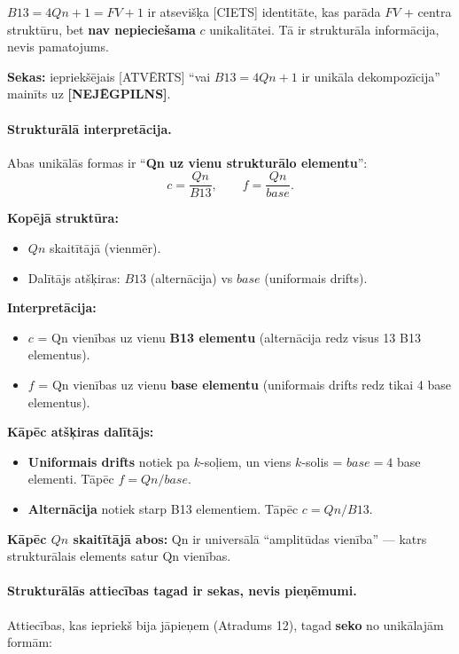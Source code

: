 \documentclass[12pt,a4paper]{article}
\begin{document}
$B13 = 4Qn+1 = FV+1$ ir atsevišķa [CIETS] identitāte, kas parāda $FV$ + centra struktūru, bet \textbf{nav nepieciešama} $c$ unikalitātei. Tā ir strukturāla informācija, nevis pamatojums.

\textbf{Sekas:} iepriekšējais [ATVĒRTS] ``vai $B13 = 4Qn+1$ ir unikāla dekompozīcija'' mainīts uz \textbf{[NEJĒGPILNS]}.

\paragraph{Strukturālā interpretācija.}
Abas unikālās formas ir ``\textbf{Qn uz vienu strukturālo elementu}'':
\[
c = \frac{Qn}{B13}, \qquad f = \frac{Qn}{base}.
\]

\textbf{Kopējā struktūra:}
\begin{itemize}
    \item $Qn$ skaitītājā (vienmēr).
    \item Dalītājs atšķiras: $B13$ (alternācija) vs $base$ (uniformais drifts).
\end{itemize}

\textbf{Interpretācija:}
\begin{itemize}
    \item $c$ = Qn vienības uz vienu \textbf{B13 elementu} (alternācija redz visus 13 B13 elementus).
    \item $f$ = Qn vienības uz vienu \textbf{base elementu} (uniformais drifts redz tikai 4 base elementus).
\end{itemize}

\textbf{Kāpēc atšķiras dalītājs:}
\begin{itemize}
    \item \textbf{Uniformais drifts} notiek pa $k$-soļiem, un viens $k$-solis = $base = 4$ base elementi. Tāpēc $f = Qn/base$.
    \item \textbf{Alternācija} notiek starp B13 elementiem. Tāpēc $c = Qn/B13$.
\end{itemize}

\textbf{Kāpēc $Qn$ skaitītājā abos:} Qn ir universālā ``amplitūdas vienība'' — katrs strukturālais elements satur Qn vienības.

\paragraph{Strukturālās attiecības tagad ir sekas, nevis pieņēmumi.}
Attiecības, kas iepriekš bija jāpieņem (Atradums 12), tagad \textbf{seko} no unikālajām formām:
\end{document}

